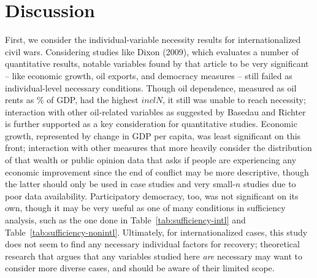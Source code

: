 \documentclass{article}
\begin{document}
\section{Discussion}
First, we consider the individual-variable necessity results for internationalized civil wars. Considering studies like Dixon (2009), which evaluates a number of quantitative results, notable variables found by that article to be very significant -- like economic growth, oil exports, and democracy measures -- still failed as individual-level necessary conditions. Though oil dependence, measured as oil rents as \% of GDP, had the highest $inclN$, it still was unable to reach necessity; interaction with other oil-related variables as suggested by Basedau and Richter ~\cite{basedau} is further supported as a key consideration for quantitative studies. Economic growth, represented by change in GDP per capita, was least significant on this front; interaction with other measures that more heavily consider the distribution of that wealth or public opinion data that asks if people are experiencing any economic improvement since the end of conflict may be more descriptive, though the latter should only be used in case studies and very small-$n$ studies due to poor data availability. Participatory democracy, too, was not significant on its own, though it may be very useful as one of many conditions in sufficiency analysis, such as the one done in Table~\ref{tab:sufficiency-intl} and Table~\ref{tab:sufficiency-nonintl}. Ultimately, for internationalized cases, this study does not seem to find any necessary individual factors for recovery; theoretical research that argues that any variables studied here \textit{are} necessary may want to consider more diverse cases, and should be aware of their limited scope.
\end{document}
